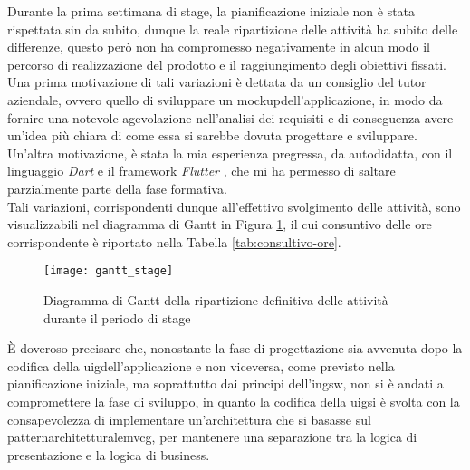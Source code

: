 Durante la prima settimana di stage, la pianificazione iniziale non è stata rispettata sin da subito, dunque la reale ripartizione delle attività ha subito delle differenze, questo però non ha compromesso negativamente in alcun modo il percorso di realizzazione del prodotto e il raggiungimento degli obiettivi fissati.\\
Una prima motivazione di tali variazioni è dettata da un consiglio del tutor aziendale, ovvero quello di sviluppare un \gls{mockup}\glsoccur dell'applicazione, in modo da fornire una notevole agevolazione nell'analisi dei requisiti e di conseguenza avere un'idea più chiara di come essa si sarebbe dovuta progettare e sviluppare.\\
Un'altra motivazione, è stata la mia esperienza pregressa, da autodidatta, con il linguaggio \emph{Dart} \cite{site:dart} e il framework \emph{Flutter} \cite{site:flutter}, che mi ha permesso di saltare parzialmente parte della fase formativa.\\
Tali variazioni, corrispondenti dunque all'effettivo svolgimento delle attività, sono visualizzabili nel diagramma di Gantt in Figura \ref{fig:gantt}, il cui consuntivo delle ore corrispondente è riportato nella Tabella \ref{tab:consultivo-ore}.

\begin{figure}[!h] 
    \centering 
    \texttt{[image: gantt\_stage]} 
    \caption{Diagramma di Gantt della ripartizione definitiva delle attività durante il periodo di stage}
    \label{fig:gantt}
\end{figure}

È doveroso precisare che, nonostante la fase di progettazione sia avvenuta dopo la codifica della \gls{uig}\glsoccur dell'applicazione e non viceversa, come previsto nella pianificazione iniziale, ma soprattutto dai principi dell'\gls{ingsw}\glsoccur, non si è andati a compromettere la fase di sviluppo, in quanto la codifica della \gls{uig}\glsoccur si è svolta con la consapevolezza di implementare un'architettura che si basasse sul \gls{patternarchitetturale}\glsoccur \Gls{mvcg}\glsoccur, per mantenere una separazione tra la logica di presentazione e la logica di business.\\

